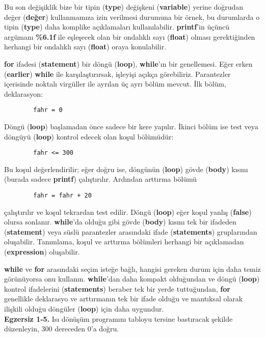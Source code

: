 \documentclass[a4paper,12pt,oneside]{book}
\begin{document}
\par Bu son değişiklik bize bir tipin (\textbf{type}) değişkeni (\textbf{variable}) yerine doğrudan değer (\textbf{değer}) kullanmamıza izin verilmesi durumuna bir örnek, bu durumlarda o tipin (\textbf{type}) daha komplike açıklamaları kullanılabilir. \textbf{printf}'in üçüncü argümanı \textbf{\%6.1f} ile eşleşecek olan bir ondalıklı sayı (\textbf{float}) olması gerektiğinden herhangi bir ondalıklı sayı (\textbf{float}) oraya konulabilir.
\par \textbf{for} ifadesi (\textbf{statement}) bir döngü (\textbf{loop}), \textbf{while}'ın bir genellemesi. Eğer erken (\textbf{earlier}) \textbf{while} ile karşılaştırırsak, işleyişi açıkça görebiliriz. Parantezler içerisinde noktalı virgüller ile ayrılan üç ayrı bölüm mevcut. İlk bölüm, deklarasyon:
\begin{lstlisting}
		fahr = 0
\end{lstlisting}
Döngü (\textbf{loop}) başlamadan önce sadece bir kere yapılır. İkinci bölüm ise test veya döngüyü (\textbf{loop}) kontrol edecek olan koşul bölümüdür:
\begin{lstlisting}
		fahr <= 300
\end{lstlisting}
Bu koşul değerlendirilir; eğer doğru ise, döngünün (\textbf{loop}) gövde (\textbf{body}) kısmı (burada sadece \textbf{printf}) çalıştırılır. Ardından arttırma bölümü
\begin{lstlisting}
		fahr = fahr + 20
\end{lstlisting}
çalıştırılır ve koşul tekrardan test edilir. Döngü (\textbf{loop}) eğer koşul yanlış (\textbf{false}) olursa sonlanır. \textbf{while}'da olduğu gibi gövde (\textbf{body}) kısmı tek bir ifadeden (\textbf{statement}) veya süslü parantezler arasındaki ifade (\textbf{statements}) gruplarından oluşabilir. Tanımlama, koşul ve arttırma bölümleri herhangi bir açıklamadan (\textbf{expression}) oluşabilir.
\par \textbf{while} ve \textbf{for} arasındaki seçim isteğe bağlı, hangisi gereken durum için daha temiz görünüyorsa onu kullanın. \textbf{while}'dan daha kompakt olduğundan ve döngü (\textbf{loop}) kontrol ifadelerini (\textbf{statements}) beraber tek bir yerde tuttuğundan, \textbf{for} genellikle deklarasyo ve arttırmanın tek bir ifade olduğu ve mantıksal olarak ilişkili olduğu döngüler (\textbf{loop}) için daha uygundur. \newline
\\ \noindent \textbf{Egzersiz 1-5.} Isı dönüşüm programını tabloyu tersine bastıracak şekilde düzenleyin, 300 dereceden 0'a doğru. \pagebreak
\end{document}
